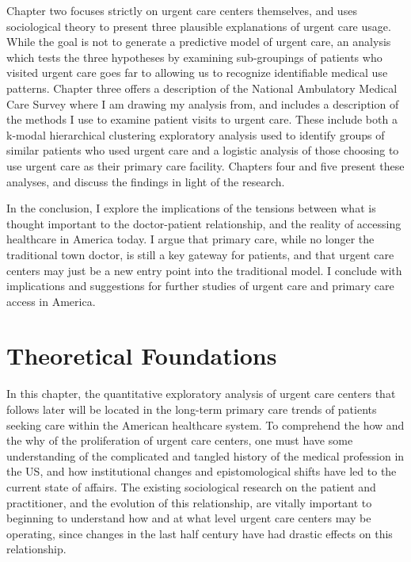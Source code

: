 \documentclass[12pt,twoside]{reedthesis}
\begin{document}
  Chapter two focuses strictly on urgent care centers themselves, and uses
  sociological theory to present three plausible explanations of urgent
  care usage. While the goal is not to generate a predictive model of
  urgent care, an analysis which tests the three hypotheses by examining
  sub-groupings of patients who visited urgent care goes far to allowing
  us to recognize identifiable medical use patterns. Chapter three offers
  a description of the National Ambulatory Medical Care Survey where I am
  drawing my analysis from, and includes a description of the methods I
  use to examine patient visits to urgent care. These include both a
  k-modal hierarchical clustering exploratory analysis used to identify
  groups of similar patients who used urgent care and a logistic analysis
  of those choosing to use urgent care as their primary care facility.
  Chapters four and five present these analyses, and discuss the findings
  in light of the research.
  
  In the conclusion, I explore the implications of the tensions between
  what is thought important to the doctor-patient relationship, and the
  reality of accessing healthcare in America today. I argue that primary
  care, while no longer the traditional town doctor, is still a key
  gateway for patients, and that urgent care centers may just be a new
  entry point into the traditional model. I conclude with implications and
  suggestions for further studies of urgent care and primary care access
  in America.
  
  \chapter{Theoretical Foundations}\label{theoretical-foundations}
  
  \setcounter{chapter}{2} \setcounter{section}{0} \doublespacing
  
  In this chapter, the quantitative exploratory analysis of urgent care
  centers that follows later will be located in the long-term primary care
  trends of patients seeking care within the American healthcare system.
  To comprehend the how and the why of the proliferation of urgent care
  centers, one must have some understanding of the complicated and tangled
  history of the medical profession in the US, and how institutional
  changes and epistomological shifts have led to the current state of
  affairs. The existing sociological research on the patient and
  practitioner, and the evolution of this relationship, are vitally
  important to beginning to understand how and at what level urgent care
  centers may be operating, since changes in the last half century have
  had drastic effects on this relationship.
  
\end{document}
